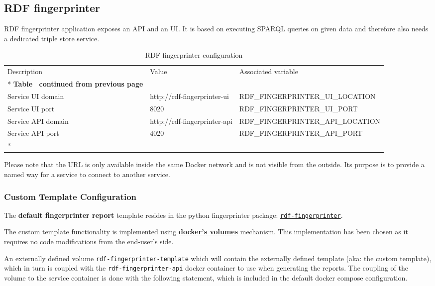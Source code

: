 	\subsection{RDF fingerprinter}
	
	RDF fingerprinter application exposes an API and an UI. It is based on executing SPARQL queries on given data and therefore also needs a dedicated triple store service. 

	\begin{longtable}[c]{@{}p{3.8cm}p{3cm}l@{}}
		\toprule
		Description & Value & Associated variable \\* \midrule
		\endfirsthead
		\multicolumn{3}{c}%
		{{\bfseries Table \thetable\ continued from previous page}} \\
		\endhead
		\bottomrule
		\endfoot
		\endlastfoot
		Service UI domain & http://rdf-fingerprinter-ui & RDF\_FINGERPRINTER\_UI\_LOCATION \\
		Service UI port & 8020 & RDF\_FINGERPRINTER\_UI\_PORT \\
		Service API domain & http://rdf-fingerprinter-api & RDF\_FINGERPRINTER\_API\_LOCATION \\
		Service API port & 4020 & RDF\_FINGERPRINTER\_API\_PORT \\* \bottomrule
		\caption{RDF fingerprinter configuration}
		\label{tab:my-table7}\\
	\end{longtable}

	Please note that the URL is only available inside the same Docker network and is not visible from the outside. Its purpose is to provide a named way for a service to connect to another service.
	
	\subsubsection{Custom Template Configuration}
		The \textbf{default fingerprinter report} template resides in the python fingerprinter package: \href{https://github.com/meaningfy-ws/rdf-fingerprinter/tree/master/fingerprint_report_templates/fingerprint_report}{\texttt{rdf-fingerprinter}}.

		The custom template functionality is implemented using \textbf{\href{https://docs.docker.com/storage/volumes/}{docker's volumes}} mechanism. This implementation has been chosen as it requires no code modifications from the end-user's side.

		An externally defined volume \texttt{rdf-fingerprinter-template} which will contain the externally defined template (aka: the custom template), which in turn is coupled with the \texttt{rdf-fingerprinter-api} docker container to use when generating the reports. The coupling of the volume to the service container is done with the following statement, which is included in the default docker compose configuration. 
		
